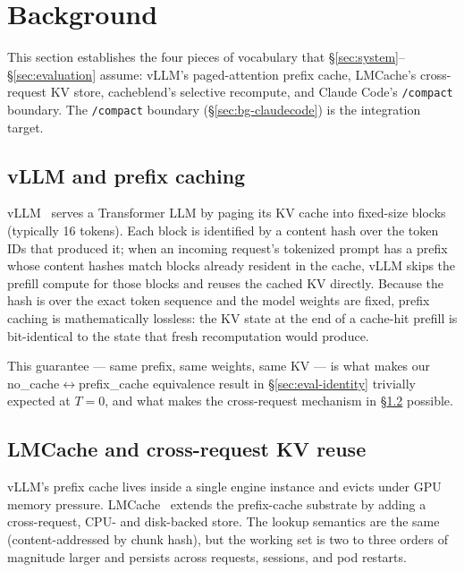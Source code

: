 
\section{Background}
\label{sec:background}

This section establishes the four pieces of vocabulary that
\S\ref{sec:system}--\S\ref{sec:evaluation} assume: vLLM's paged-attention
prefix cache, LMCache's cross-request KV store, cacheblend's selective
recompute, and Claude Code's \texttt{/compact} boundary. The
\texttt{/compact} boundary (\S\ref{sec:bg-claudecode}) is the
integration target.

\subsection{vLLM and prefix caching}
\label{sec:bg-vllm}

vLLM~\cite{vllm-sosp} serves a Transformer LLM by paging its KV cache
into fixed-size blocks (typically 16 tokens). Each block is identified
by a content hash over the token IDs that produced it; when an incoming
request's tokenized prompt has a prefix whose content hashes match
blocks already resident in the cache, vLLM skips the prefill compute
for those blocks and reuses the cached KV directly. Because the hash
is over the exact token sequence and the model weights are fixed,
prefix caching is mathematically lossless: the KV state at the end of
a cache-hit prefill is bit-identical to the state that fresh
recomputation would produce.

This guarantee --- same prefix, same weights, same KV --- is what makes
our no\_cache$\leftrightarrow$prefix\_cache equivalence result in
\S\ref{sec:eval-identity} trivially expected at $T=0$, and what makes
the cross-request mechanism in \S\ref{sec:bg-lmcache} possible.

\subsection{LMCache and cross-request KV reuse}
\label{sec:bg-lmcache}

vLLM's prefix cache lives inside a single engine instance and evicts
under GPU memory pressure. LMCache~\cite{lmcache-paper} extends the
prefix-cache substrate by adding a cross-request, CPU- and
disk-backed store. The lookup semantics are the same (content-addressed
by chunk hash), but the working set is two to three orders of magnitude
larger and persists across requests, sessions, and pod restarts.


